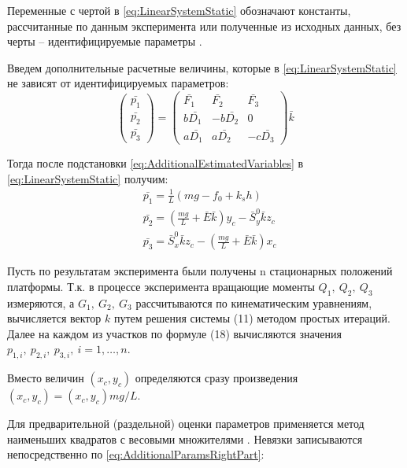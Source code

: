 Переменные с чертой в \ref{eq:LinearSystemStatic} обозначают константы, рассчитанные по данным эксперимента или полученные из исходных данных, без черты – идентифицируемые параметры \cite{Graupe}.

Введем дополнительные расчетные величины, которые в \ref{eq:LinearSystemStatic} не зависят от идентифицируемых параметров:
\begin{equation}
\label{eq:AdditionalEstimatedVariables}
\begin{pmatrix}
\bar{p_1} \\ \bar{p_2} \\ \bar{p_3}
\end{pmatrix} =
\begin{pmatrix}
\bar{F_1} & \bar{F_2} & \bar{F_3} \\
b\bar{D_1} & -b\bar{D_2} & 0 \\
a\bar{D_1} & a\bar{D_2} & -c\bar{D_3}
\end{pmatrix}\bar{k}
\end{equation}

Тогда после подстановки \ref{eq:AdditionalEstimatedVariables} в \ref{eq:LinearSystemStatic} получим:
\begin{equation}
\label{eq:AdditionalParamsRightPart}
\begin{aligned}
& \bar{p_1} = \frac{1}{L}\left(mg - f_0 + k_sh\right)\\
& \bar{p_2} = \left(\frac{mg}{L}+\bar{E}\bar{k}\right)y_c - \bar{S}^0_y\bar{k}z_c \\
& \bar{p_3} = \bar{S}^0_x\bar{k}z_c - \left(\frac{mg}{L}+\bar{E}\bar{k}\right)x_c
\end{aligned}
\end{equation}

Пусть по результатам эксперимента были получены n стационарных положений платформы. Т.к. в процессе эксперимента вращающие моменты $Q_1,~Q_2,~Q_3$ измеряются, а $G_1,~G_2,~G_3$ рассчитываются по кинематическим уравнениям, вычисляется вектор $k$ путем решения системы (11) методом простых итераций. Далее на каждом из участков по формуле (18) вычисляются значения  $p_{1,i},~p_{2,i},~p_{3,i},~i = 1,\dots,n$.

Вместо величин $\left(x_c, y_c\right)$ определяются сразу произведения $\left(x_c, y_c\right) = \left(x_c, y_c\right) mg/L$.

Для предварительной (раздельной) оценки параметров применяется метод наименьших квадратов с весовыми множителями \cite{Graupe}. Невязки записываются непосредственно по \ref{eq:AdditionalParamsRightPart}:

